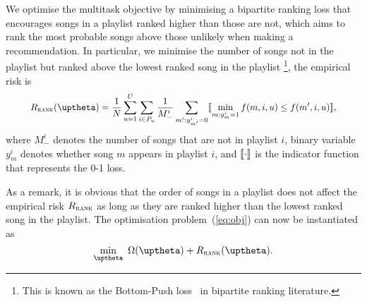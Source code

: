%
%
We optimise the multitask objective by minimising a bipartite ranking loss 
that encourages songs in a playlist ranked higher than those are not, 
which aims to rank the most probable songs above those unlikely when making a recommendation.
In particular, we minimise the number of songs not in the playlist but ranked above the lowest ranked song in the playlist
\footnote{This is known as the Bottom-Push loss~\cite{rudin2009p} in bipartite ranking literature.},
\ie the %
empirical risk is
\begin{equation}
\label{eq:bprisk}
\resizebox{.9\linewidth}{!}{$\displaystyle
R_\textsc{rank}(\upthetabm) = \frac{1}{N} \sum_{u=1}^U \sum_{i \in P_u} \frac{1}{M_-^i} \sum_{m': y_{m'}^i = 0} 
\llb \min_{m: y_m^i = 1} f(m, i, u) \le f(m', i, u) \rrb,
$}
\end{equation}
where $M_-^i$ denotes the number of songs that are not in playlist $i$,
binary variable $y_m^i$ denotes whether song $m$ appears in playlist $i$,
and $\llbracket \cdot \rrbracket$ is the indicator function that represents the 0-1 loss.

As a remark, it is obvious that the order of songs in a playlist does not affect the empirical 
risk $R_\textsc{rank}$ as long as they are ranked higher than the lowest ranked song in the playlist.
The optimisation problem~(\ref{eq:obj}) can now be instantiated as 
\begin{equation}
\label{eq:obj_rank}
\min_\upthetabm \ \Omega(\upthetabm) + R_\textsc{rank}(\upthetabm).
\end{equation}

